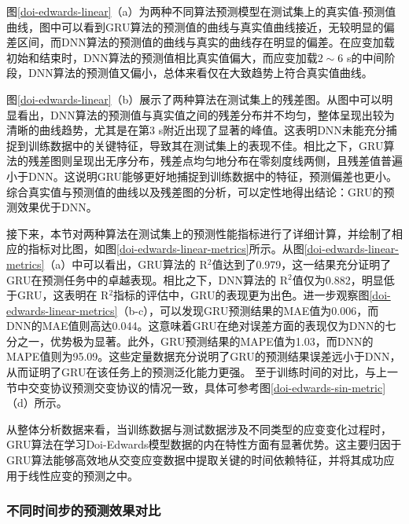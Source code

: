 图\ref{doi-edwards-linear}（a）为两种不同算法预测模型在测试集上的真实值-预测值曲线，图中可以看到GRU算法的预测值的曲线与真实值曲线接近，无较明显的偏差区间，而DNN算法的预测值的曲线与真实的曲线存在明显的偏差。在应变加载初始和结束时，DNN算法的预测值相比真实值偏大，而应变加载$2\sim6$ s的中间阶段，DNN算法的预测值又偏小，总体来看仅在大致趋势上符合真实值曲线。

图\ref{doi-edwards-linear}（b）展示了两种算法在测试集上的残差图。从图中可以明显看出，DNN算法的预测值与真实值之间的残差分布并不均匀，整体呈现出较为清晰的曲线趋势，尤其是在第3 s附近出现了显著的峰值。这表明DNN未能充分捕捉到训练数据中的关键特征，导致其在测试集上的表现不佳。相比之下，GRU算法的残差图则呈现出无序分布，残差点均匀地分布在零刻度线两侧，且残差值普遍小于DNN。这说明GRU能够更好地捕捉到训练数据中的特征，预测偏差也更小。综合真实值与预测值的曲线以及残差图的分析，可以定性地得出结论：GRU的预测效果优于DNN。

接下来，本节对两种算法在测试集上的预测性能指标进行了详细计算，并绘制了相应的指标对比图，如图\ref{doi-edwards-linear-metrics}所示。从图\ref{doi-edwards-linear-metrics}（a）中可以看出，GRU算法的 R$^2$值达到了0.979，这一结果充分证明了GRU在预测任务中的卓越表现。相比之下，DNN算法的 R$^2$值仅为0.882，明显低于GRU，这表明在 R$^2$指标的评估中，GRU的表现更为出色。进一步观察图\ref{doi-edwards-linear-metrics}（b-c），可以发现GRU预测结果的MAE值为0.006，而DNN的MAE值则高达0.044。这意味着GRU在绝对误差方面的表现仅为DNN的七分之一，优势极为显著。此外，GRU预测结果的MAPE值为1.03，而DNN的MAPE值则为95.09。这些定量数据充分说明了GRU的预测结果误差远小于DNN，从而证明了GRU在该任务上的预测泛化能力更强。
至于训练时间的对比，与上一节中交变协议预测交变协议的情况一致，具体可参考图\ref{doi-edwards-sin-metric}（d）所示。

从整体分析数据来看，当训练数据与测试数据涉及不同类型的应变变化过程时，GRU算法在学习Doi-Edwards模型数据的内在特性方面有显著优势。这主要归因于GRU算法能够高效地从交变应变数据中提取关键的时间依赖特征，并将其成功应用于线性应变的预测之中。

\subsubsection{不同时间步的预测效果对比}

